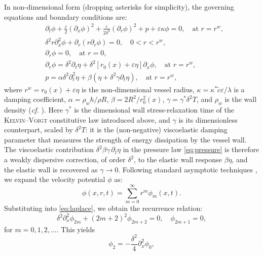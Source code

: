 \documentclass[alpha-refs, 12pt]{wiley-article}
\newcommand{\eps}{\varepsilon}
\begin{document}
In non-dimensional form (dropping asterisks for simplicity), the governing equations and boundary conditions are:
\begin{align}
& \partial_t \phi + \frac{\eps}{2} (\partial_x \phi)^2 + \frac{\eps}{2 \delta^2} (\partial_r \phi)^2 + p + \eps \kappa \phi = 0, \quad \text{at } r = r^w, \label{eq:bernoulli} \\
& \delta^2 r \partial_x^2 \phi + \partial_r (r \partial_r \phi) = 0, \quad 0 < r < r^w, \label{eq:laplace} \\
& \partial_r \phi = 0, \quad \text{at } r = 0, \label{eq:center_bc} \\
& \partial_r \phi = \delta^2 \partial_t \eta + \delta^2 [r_0(x) + \eps \eta] \partial_x \phi, \quad \text{at } r = r^w, \label{eq:wall_bc} \\
& p = \alpha \delta^2 \partial_t^2 \eta + \beta (\eta + \delta^2 \gamma \partial_t \eta), \quad \text{at } r = r^w, \label{eq:pressure}
\end{align}
where $r^w = r_0(x) + \eps \eta$ is the non-dimensional vessel radius, $\kappa = \kappa^* \tilde{c} \eps / \lambda$ is a damping coefficient, $\alpha = \rho_w h / \rho R$, $\beta = 2 R^2 / r_0^2(x)$, $\gamma = \gamma^* \delta^2 T$, and $\rho_w$ is the wall density (\emph{cf.} \citet{Mitsotakis2019}). Here $\gamma^*$ is the dimensional wall stress-relaxation time of the \textsc{Kelvin}--\textsc{Voigt} constitutive law introduced above, and $\gamma$ is its dimensionless counterpart, scaled by $\delta^2 T$: it is the (non-negative) viscoelastic damping parameter that measures the strength of energy dissipation by the vessel wall. The viscoelastic contribution $\delta^2\beta\gamma\,\partial_t\eta$ in the pressure law \eqref{eq:pressure} is therefore a weakly dispersive correction, of order $\delta^2$, to the elastic wall response $\beta\eta$, and the elastic wall is recovered as $\gamma\to 0$. Following standard asymptotic techniques \citep{BCS}, we expand the velocity potential $\phi$ as:
\begin{equation}\label{eq:potential}
  \phi(x, r, t) = \sum_{m=0}^\infty r^m \phi_m(x, t).
\end{equation}
Substituting into \eqref{eq:laplace}, we obtain the recurrence relation:
\begin{equation}\label{eq:recurr}
  \delta^2 \partial_x^2 \phi_{2m} + (2m + 2)^2 \phi_{2m+2} = 0, \quad \phi_{2m+1} = 0,
\end{equation}
for $m = 0, 1, 2, \dots$. This yields
\begin{equation}\label{eq:phi2}
  \phi_2 = -\frac{\delta^2}{4} \partial_x^2 \phi_0,
\end{equation}
\end{document}
